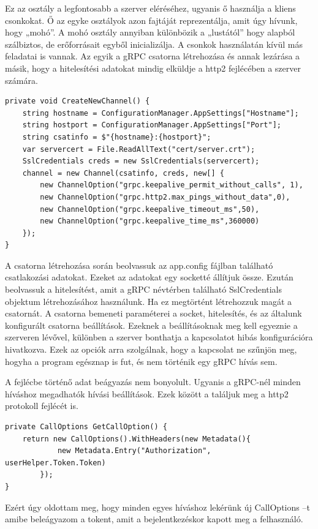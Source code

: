 \documentclass[
]{thesis-ekf}
\theoremstyle{definition}
\theoremstyle{remark}
\begin{document}
Ez az osztály a legfontosabb a szerver eléréséhez, ugyanis ő használja a kliens csonkokat. Ő az egyke osztályok azon fajtáját reprezentálja, amit úgy hívunk, hogy „mohó”. A mohó osztály annyiban különbözik a „lustától” hogy alapból szálbiztos, de erőforrásait egyből inicializálja. A csonkok használatán kívül más feladatai is vannak. Az egyik a gRPC csatorna létrehozása és annak lezárása a másik, hogy a hitelesítési adatokat mindig elküldje a http2 fejlécében a szerver számára.
\begin{lstlisting}[showstringspaces=false,caption={gRPC csatorna készítése.},captionpos=b]
private void CreateNewChannel() {
	string hostname = ConfigurationManager.AppSettings["Hostname"];
	string hostport = ConfigurationManager.AppSettings["Port"];
	string csatinfo = $"{hostname}:{hostport}";
	var servercert = File.ReadAllText("cert/server.crt");
	SslCredentials creds = new SslCredentials(servercert);
	channel = new Channel(csatinfo, creds, new[] {
		new ChannelOption("grpc.keepalive_permit_without_calls", 1),
		new ChannelOption("grpc.http2.max_pings_without_data",0),
		new ChannelOption("grpc.keepalive_timeout_ms",50),
		new ChannelOption("grpc.keepalive_time_ms",360000)
	});
}
\end{lstlisting}
A csatorna létrehozása során beolvassuk az app.config fájlban található csatlakozási adatokat. Ezeket az adatokat egy socketté állítjuk össze. Ezután beolvassuk a hitelesítést, amit a gRPC névtérben található SslCredentials objektum létrehozásához használunk. Ha ez megtörtént létrehozzuk magát a csatornát. A csatorna bemeneti paraméterei a socket, hitelesítés, és az általunk konfigurált csatorna beállítások. Ezeknek a beállításoknak meg kell egyeznie a szerveren lévővel, különben a szerver bonthatja a kapcsolatot hibás konfigurációra hivatkozva. Ezek az opciók arra szolgálnak, hogy a kapcsolat ne szűnjön meg, hogyha a program egésznap is fut, és nem történik egy gRPC hívás sem.

A fejlécbe történő adat beágyazás nem bonyolult. Ugyanis a gRPC-nél minden híváshoz megadhatók hívási beállítások. Ezek között a találjuk meg a http2 protokoll fejlécét is.
\begin{lstlisting}[showstringspaces=false,caption={CallOption beállítása.},captionpos=b]
private CallOptions GetCallOption() {
	return new CallOptions().WithHeaders(new Metadata(){
			new Metadata.Entry("Authorization", userHelper.Token.Token)
		});
}
\end{lstlisting}
Ezért úgy oldottam meg, hogy minden egyes híváshoz lekérünk új CallOptions –t amibe beleágyazom a tokent, amit a bejelentkezéskor kapott meg a felhasználó. 
\end{document}
